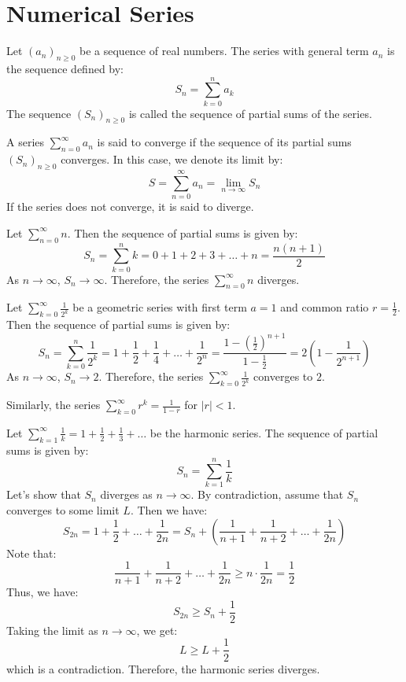 \chapter{Numerical Series}

\begin{definition}[Series]
    Let $(a_n)_{n\geq 0}$ be a sequence of real numbers. The series with general term $a_n$ is the sequence defined by:
    \[
        S_n = \sum_{k=0}^n a_k
    \]
    The sequence $(S_n)_{n\geq 0}$ is called the sequence of partial sums of the series.
\end{definition}

\begin{definition}
    A series $\sum_{n=0}^{\infty} a_n$ is said to converge if the sequence of its partial sums $(S_n)_{n\geq 0}$ converges. In this case, we denote its limit by:
    \[
        S = \sum_{n=0}^{\infty} a_n = \lim_{n \to \infty} S_n
    \]
    If the series does not converge, it is said to diverge.
\end{definition}

\begin{eg}
    Let $\sum_{n = 0}^{\infty} n$. Then the sequence of partial sums is given by:
    \[
        S_n = \sum_{k=0}^n k = 0 + 1 + 2 + 3 + \ldots + n = \frac{n(n+1)}{2}
    \]
    As $n \to \infty$, $S_n \to \infty$. Therefore, the series $\sum_{n=0}^{\infty} n$ diverges.
\end{eg}
\begin{eg}
    Let $\sum_{k = 0}^{\infty} \frac{1}{2^k}$ be a geometric series with first term $a = 1$ and common ratio $r = \frac{1}{2}$. Then the sequence of partial sums is given by:
    \[
        S_n = \sum_{k=0}^n \frac{1}{2^k} = 1 + \frac{1}{2} + \frac{1}{4} + \ldots + \frac{1}{2^n} = \frac{1 - \left(\frac{1}{2}\right)^{n+1}}{1 - \frac{1}{2}} = 2\left(1 - \frac{1}{2^{n+1}}\right)
    \]
    As $n \to \infty$, $S_n \to 2$. Therefore, the series $\sum_{k = 0}^{\infty} \frac{1}{2^k}$ converges to $2$.
\end{eg}
Similarly, the series $\sum_{k = 0}^{\infty} r^k = \frac{1}{1 - r}$ for $|r| < 1$.
\begin{eg}
    Let $\sum_{k = 1}^{\infty} \frac{1}{k} = 1 + \frac{1}{2} + \frac{1}{3} + \ldots$ be the harmonic series. The sequence of partial sums is given by:
    \[
        S_n = \sum_{k=1}^n \frac{1}{k}
    \]
    Let's show that $S_n$ diverges as $n \to \infty$. By contradiction, assume that $S_n$ converges to some limit $L$. Then we have:
    \[
        S_{2n} = 1 + \frac{1}{2} + \ldots + \frac{1}{2n} = S_n + \left(\frac{1}{n+1} + \frac{1}{n+2} + \ldots + \frac{1}{2n}\right)
    \]
    Note that:
    \[
        \frac{1}{n+1} + \frac{1}{n+2} + \ldots + \frac{1}{2n} \geq n \cdot \frac{1}{2n} = \frac{1}{2}
    \]
    Thus, we have:
    \[
        S_{2n} \geq S_n + \frac{1}{2}
    \]
    Taking the limit as $n \to \infty$, we get:
    \[
        L \geq L + \frac{1}{2}
    \]
    which is a contradiction. Therefore, the harmonic series diverges.
\end{eg}

